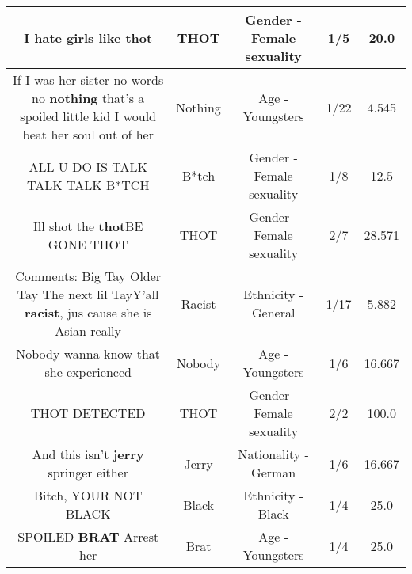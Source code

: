 \documentclass[11pt]{article}
\newlength\mylength
\begin{document}
\begin{center}
\begin{longtable}{|C{.65\mylength}|C{.30\mylength}|C{.12\mylength}|C{.12\mylength}|C{.12\mylength}|}
  \small I hate girls like thot\normalsize   & THOT & Gender - Female sexuality & 1/5 & 20.0 \\  \hline
  \small If I was her sister no words no \textbf{nothing} that's a spoiled little kid I would beat her soul out of her\normalsize   & Nothing & Age - Youngsters & 1/22 & 4.545 \\  \hline
  \small ALL U DO IS TALK TALK TALK B*TCH\normalsize   & B*tch & Gender - Female sexuality & 1/8 & 12.5 \\  \hline
  \small Ill shot the \textbf{thot}BE GONE THOT\normalsize   & THOT & Gender - Female sexuality & 2/7 & 28.571 \\  \hline
  \small Comments: Big Tay     Older Tay     The next lil TayY'all \textbf{racist}, jus cause she is Asian really\normalsize   & Racist & Ethnicity - General & 1/17 & 5.882 \\  \hline
  \small Nobody wanna know that she experienced\normalsize   & Nobody & Age - Youngsters & 1/6 & 16.667 \\  \hline
  \small THOT DETECTED\normalsize   & THOT & Gender - Female sexuality & 2/2 & 100.0 \\  \hline
  \small And this isn't \textbf{jerry} springer either\normalsize   & Jerry & Nationality - German & 1/6 & 16.667 \\  \hline
  \small Bitch, YOUR NOT BLACK\normalsize   & Black & Ethnicity - Black & 1/4 & 25.0 \\  \hline
  \small SPOILED \textbf{BRAT} Arrest her\normalsize   & Brat & Age - Youngsters & 1/4 & 25.0 \\  \hline

\end{longtable}
\end{center}
\end{document}

